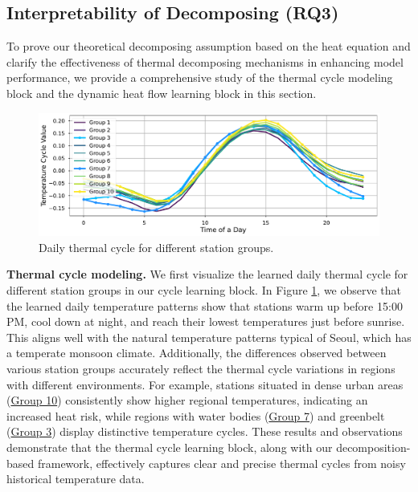 \subsection{Interpretability of Decomposing (RQ3)}
To prove our theoretical decomposing assumption based on the heat equation and clarify the effectiveness of thermal decomposing mechanisms in enhancing model performance, we provide a comprehensive study of the thermal cycle modeling block and the dynamic heat flow learning block in this section.

\begin{figure}[h]
    \centering
    \includegraphics[width=1.0\linewidth]{resources/cycle.pdf}
    \vspace{-2.5em}
    \caption{Daily thermal cycle for different station groups.}
    \label{fig:cycle}
\end{figure}

\textbf{Thermal cycle modeling.} We first visualize the learned daily thermal cycle for different station groups in our cycle learning block. In Figure \ref{fig:cycle}, we observe that the learned daily temperature patterns show that stations warm up before 15:00 PM, cool down at night, and reach their lowest temperatures just before sunrise. This aligns well with the natural temperature patterns typical of Seoul, which has a temperate monsoon climate. Additionally, the differences observed between various station groups accurately reflect the thermal cycle variations in regions with different environments. For example, stations situated in dense urban areas (\underline{Group 10}) consistently show higher regional temperatures, indicating an increased heat risk, while regions with water bodies (\underline{Group 7}) and greenbelt (\underline{Group 3}) display distinctive temperature cycles. These results and observations demonstrate that the thermal cycle learning block, along with our decomposition-based framework, effectively captures clear and precise thermal cycles from noisy historical temperature data.


